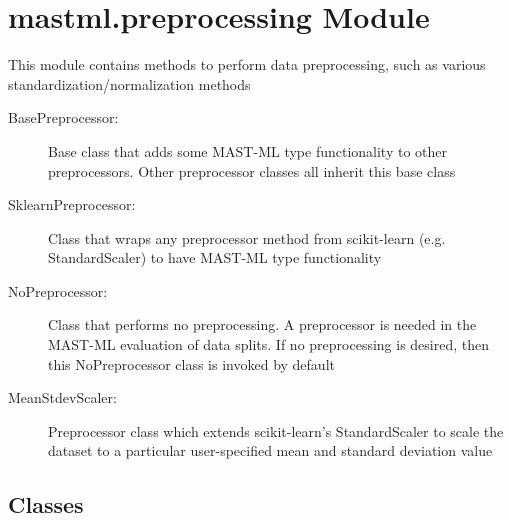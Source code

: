 \documentclass[letterpaper,10pt,english]{sphinxmanual}
\begin{document}
\section{mastml.preprocessing Module}
\label{\detokenize{13_preprocessing:module-mastml.preprocessing}}\label{\detokenize{13_preprocessing:mastml-preprocessing-module}}
This module contains methods to perform data preprocessing, such as various standardization/normalization methods
\begin{description}
\item[{BasePreprocessor:}] \leavevmode
Base class that adds some MAST-ML type functionality to other preprocessors. Other preprocessor classes all inherit
this base class

\item[{SklearnPreprocessor:}] \leavevmode
Class that wraps any preprocessor method from scikit-learn (e.g. StandardScaler) to have MAST-ML type functionality

\item[{NoPreprocessor:}] \leavevmode
Class that performs no preprocessing. A preprocessor is needed in the MAST-ML evaluation of data splits. If no
preprocessing is desired, then this NoPreprocessor class is invoked by default

\item[{MeanStdevScaler:}] \leavevmode
Preprocessor class which extends scikit-learn’s StandardScaler to scale the dataset to a particular user-specified
mean and standard deviation value

\end{description}


\subsection{Classes}
\label{\detokenize{13_preprocessing:classes}}
\end{document}

